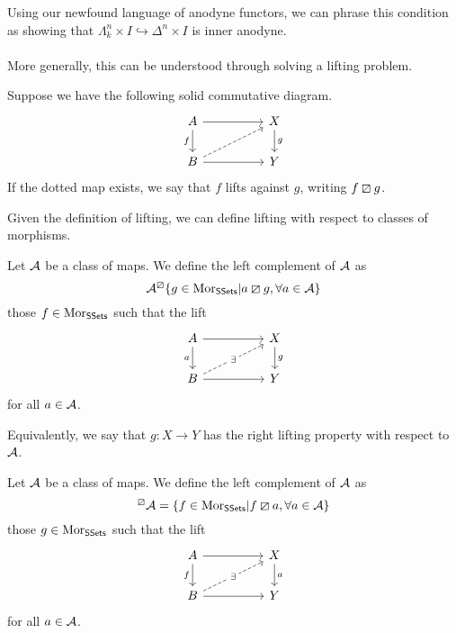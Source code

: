 Using our newfound language of anodyne functors, we can phrase this condition as showing that $\Lambda^{n}_{k}\times I\hookrightarrow \Delta^{n}\times I$ is inner anodyne. 
\\\\
More generally, this can be understood through solving a lifting problem. 
\begin{definition}[Lifting]\label{def: lifting}
  Suppose we have the following solid commutative diagram. 
  $$%
  \begin{tikzcd}
    A && X \\
    B && Y
    \arrow[from=1-1, to=1-3]
    \arrow["g", from=1-3, to=2-3]
    \arrow["f"', from=1-1, to=2-1]
    \arrow[from=2-1, to=2-3]
    \arrow[dashed, from=2-1, to=1-3]
  \end{tikzcd}$$
  If the dotted map exists, we say that $f$ lifts against $g$, writing $f\boxslash g$. 
\end{definition}
Given the definition of lifting, we can define lifting with respect to classes of morphisms. 
\begin{definition}\label{def: right complement}
  Let $\mathcal{A}$ be a class of maps. We define the left complement of $\mathcal{A}$ as
  $$\mathcal{A}^{\boxslash}\{g\in\mathrm{Mor}_{\mathsf{SSets}}|a\boxslash g, \forall a\in\mathcal{A}\}$$ 
  those $f\in\mathrm{Mor}_{\mathsf{SSets}}$ such that the lift 
  $$%
  \begin{tikzcd}
    A && X \\
    B && Y
    \arrow[from=1-1, to=1-3]
    \arrow["g", from=1-3, to=2-3]
    \arrow["a"', from=1-1, to=2-1]
    \arrow[from=2-1, to=2-3]
    \arrow["\exists"{description}, dashed, from=2-1, to=1-3]
  \end{tikzcd}$$
  for all $a\in\mathcal{A}$. 
\end{definition}
\begin{remark}
  Equivalently, we say that $g:X\to Y$ has the right lifting property with respect to $\mathcal{A}$. 
\end{remark}
\begin{definition}\label{def: left complement}
  Let $\mathcal{A}$ be a class of maps. We define the left complement of $\mathcal{A}$ as 
  $$^{\boxslash}\mathcal{A}=\{f\in\mathrm{Mor}_{\mathsf{SSets}}|f\boxslash a, \forall a\in\mathcal{A}\}$$
  those $g\in\mathrm{Mor}_{\mathsf{SSets}}$ such that the lift 
  $$%
  \begin{tikzcd}
    A && X \\
    B && Y
    \arrow[from=1-1, to=1-3]
    \arrow["a", from=1-3, to=2-3]
    \arrow["f"', from=1-1, to=2-1]
    \arrow[from=2-1, to=2-3]
    \arrow["\exists"{description}, dashed, from=2-1, to=1-3]
  \end{tikzcd}$$
  for all $a\in\mathcal{A}$. 
\end{definition}
